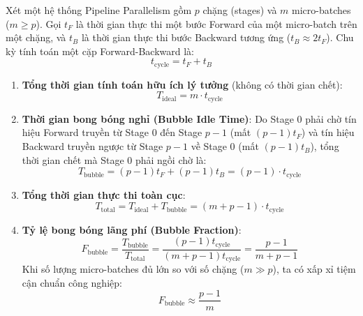 \begin{theorem}
Xét một hệ thống Pipeline Parallelism gồm $p$ chặng (stages) và $m$ micro-batches ($m \ge p$).
Gọi $t_F$ là thời gian thực thi một bước Forward của một micro-batch trên một chặng, và $t_B$ là thời gian thực thi bước Backward tương ứng ($t_B \approx 2 t_F$).
Chu kỳ tính toán một cặp Forward-Backward là:
\begin{equation}
t_{\text{cycle}} = t_F + t_B
\end{equation}
\begin{enumerate}
  \item \textbf{Tổng thời gian tính toán hữu ích lý tưởng} (không có thời gian chết):
  \begin{equation}
  T_{\text{ideal}} = m \cdot t_{\text{cycle}}
  \end{equation}
  \item \textbf{Thời gian bong bóng nghỉ (Bubble Idle Time)}:
  Do Stage 0 phải chờ tín hiệu Forward truyền từ Stage 0 đến Stage $p-1$ (mất $(p-1) t_F$) và tín hiệu Backward truyền ngược từ Stage $p-1$ về Stage 0 (mất $(p-1) t_B$), tổng thời gian chết mà Stage 0 phải ngồi chờ là:
  \begin{equation}
  T_{\text{bubble}} = (p - 1) t_F + (p - 1) t_B = (p - 1) \cdot t_{\text{cycle}}
  \end{equation}
  \item \textbf{Tổng thời gian thực thi toàn cục}:
  \begin{equation}
  T_{\text{total}} = T_{\text{ideal}} + T_{\text{bubble}} = (m + p - 1) \cdot t_{\text{cycle}}
  \end{equation}
  \item \textbf{Tỷ lệ bong bóng lãng phí (Bubble Fraction)}:
  \begin{equation}
  \label{eq:bubble-fraction-exact}
  F_{\text{bubble}} = \frac{T_{\text{bubble}}}{T_{\text{total}}} = \frac{(p - 1) t_{\text{cycle}}}{(m + p - 1) t_{\text{cycle}}} = \frac{p - 1}{m + p - 1}
  \end{equation}
  Khi số lượng micro-batches đủ lớn so với số chặng ($m \gg p$), ta có xấp xỉ tiệm cận chuẩn công nghiệp:
  \begin{equation}
  \label{eq:bubble-fraction-approx}
  F_{\text{bubble}} \approx \frac{p - 1}{m}
  \end{equation}
\end{enumerate}
\end{theorem}

